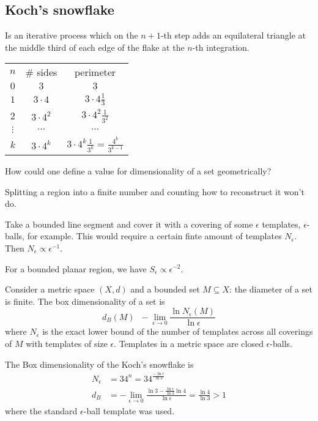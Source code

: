 \documentclass[a4paper]{article}
\newcommand{\defn}{\mathop{\overset{\Delta}{=}}\nolimits}
\begin{document}
\subsection{Koch's snowflake} %
\label{sub:koch_s_snowflake}

Is an iterative process which on the $n+1$-th step adds an equilateral triangle at the middle third of each edge of the flake at the $n$-th integration.

\begin{tabular}{c|c|c}
$n$ & \# sides & perimeter \\
$0$ & $3$ & $3$ \\
$1$ & $3\cdot 4$ & $3 \cdot 4 \frac{1}{3}$ \\
$2$ & $3\cdot 4^2$ & $3 \cdot 4^2 \frac{1}{3^2}$ \\
$\vdots$ & $\cdots$ & $\cdots$\\
$k$ & $3 \cdot 4^k$ & $3 \cdot 4^k \frac{1}{3^k} = \frac{4^k}{3^{k-1}}$
\end{tabular}


How could one define a value for dimensionality of a set geometrically?

Splitting a region into a finite number and counting how to reconstruct it won't do.


Take a bounded line segment and cover it with a covering of some $\epsilon$ templates, $\epsilon$-balls, for example. This would require a certain finte amount of templates $N_\epsilon$. Then $N_\epsilon\propto \epsilon^{-1}$.

For a bounded planar region, we have $S_\epsilon\propto \epsilon^{-2}$.

Consider a metric space $(X,d)$ and a bounded set $M\subseteq X$: the diameter of a set is finite. The box dimensionality of a set is
\[d_B(M)\defn -\lim_{\epsilon\to 0} \frac{\ln N_\epsilon(M)}{\ln \epsilon}\]
where $N_\epsilon$ is the exact lower bound of the number of templates across all coverings of $M$ with templates of size $\epsilon$. Templates in a metric space are closed $\epsilon$-balls.

The Box dimensionality of the Koch's snowflake is
\begin{align*}
	N_\epsilon &= 3 4^n = 3 4^\frac{-\ln \epsilon}{\ln 3}\\
	d_B &= -\lim_{\epsilon\to 0} \frac{\ln 3 - \frac{\ln \epsilon}{\ln 3} \ln 4}{\ln \epsilon} = \frac{\ln 4}{\ln 3} > 1
\end{align*}
where the standard $\epsilon$-ball template was used.
\end{document}
